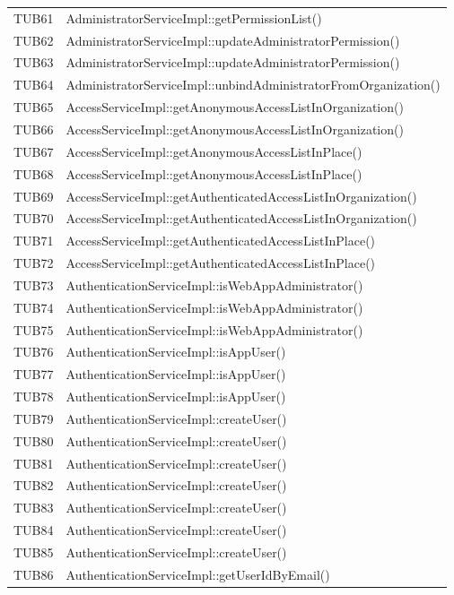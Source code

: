 {\begin{longtable}{C{2cm} C{8cm}}
		TUB61 & AdministratorServiceImpl::getPermissionList()\\
		TUB62 & AdministratorServiceImpl::updateAdministratorPermission()\\
		TUB63 & AdministratorServiceImpl::updateAdministratorPermission()\\
		TUB64 & AdministratorServiceImpl::unbindAdministratorFromOrganization()\\
		TUB65 & AccessServiceImpl::getAnonymousAccessListInOrganization()\\
		TUB66 & AccessServiceImpl::getAnonymousAccessListInOrganization()\\
		TUB67 & AccessServiceImpl::getAnonymousAccessListInPlace()\\
		TUB68 & AccessServiceImpl::getAnonymousAccessListInPlace()\\
		TUB69 & AccessServiceImpl::getAuthenticatedAccessListInOrganization()\\
		TUB70 & AccessServiceImpl::getAuthenticatedAccessListInOrganization()\\
		TUB71 & AccessServiceImpl::getAuthenticatedAccessListInPlace()\\
		TUB72 & AccessServiceImpl::getAuthenticatedAccessListInPlace()\\
		TUB73 & AuthenticationServiceImpl::isWebAppAdministrator()\\
		TUB74 & AuthenticationServiceImpl::isWebAppAdministrator()\\
		TUB75 & AuthenticationServiceImpl::isWebAppAdministrator()\\
		TUB76 & AuthenticationServiceImpl::isAppUser()\\
		TUB77 & AuthenticationServiceImpl::isAppUser()\\
		TUB78 & AuthenticationServiceImpl::isAppUser()\\
		TUB79 & AuthenticationServiceImpl::createUser()\\
		TUB80 & AuthenticationServiceImpl::createUser()\\
		TUB81 & AuthenticationServiceImpl::createUser()\\
		TUB82 & AuthenticationServiceImpl::createUser()\\
		TUB83 & AuthenticationServiceImpl::createUser()\\
		TUB84 & AuthenticationServiceImpl::createUser()\\
		TUB85 & AuthenticationServiceImpl::createUser()\\
		TUB86 & AuthenticationServiceImpl::getUserIdByEmail()\\

\end{longtable}}
